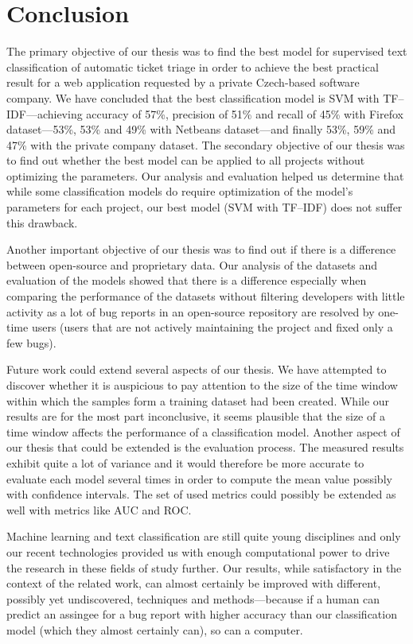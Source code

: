 \chapter{Conclusion}

The primary objective of our thesis was to find the best model for supervised text classification of automatic ticket triage in order to achieve the best practical result for a web application requested by a private Czech-based software company. We have concluded that the best classification model is SVM with TF--IDF---achieving accuracy of 57\%, precision of 51\% and recall of 45\% with Firefox dataset---53\%, 53\% and 49\% with Netbeans dataset---and finally 53\%, 59\% and 47\% with the private company dataset. The secondary objective of our thesis was to find out whether the best model can be applied to all projects without optimizing the parameters. Our analysis and evaluation helped us determine that while some classification models do require optimization of the model's parameters for each project, our best model (SVM with TF--IDF) does not suffer this drawback.

Another important objective of our thesis was to find out if there is a difference between open-source and proprietary data. Our analysis of the datasets and evaluation of the models showed that there is a difference especially when comparing the performance of the datasets without filtering developers with little activity as a lot of bug reports in an open-source repository are resolved by one-time users (users that are not actively maintaining the project and fixed only a few bugs).

Future work could extend several aspects of our thesis. We have attempted to discover whether it is auspicious to pay attention to the size of the time window within which the samples form a training dataset had been created. While our results are for the most part inconclusive, it seems plausible that the size of a time window affects the performance of a classification model. Another aspect of our thesis that could be extended is the evaluation process. The measured results exhibit quite a lot of variance and it would therefore be more accurate to evaluate each model several times in order to compute the mean value possibly with confidence intervals. The set of used metrics could possibly be extended as well with metrics like AUC and ROC.

Machine learning and text classification are still quite young disciplines and only our recent technologies provided us with enough computational power to drive the research in these fields of study further. Our results, while satisfactory in the context of the related work, can almost certainly be improved with different, possibly yet undiscovered, techniques and methods---because if a human can predict an assingee for a bug report with higher accuracy than our classification model (which they almost certainly can), so can a computer.

